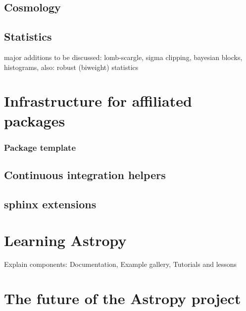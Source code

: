 \documentclass[modern]{aastex61}
\begin{document}

\subsection{Cosmology}


\subsection{Statistics}
major additions to be discussed: lomb-scargle, sigma clipping, bayesian blocks, histograms, also:  robust (biweight) statistics

\section{Infrastructure for affiliated packages}
\subsubsection{Package template}
\subsection{Continuous integration helpers}
\subsection{sphinx extensions}



\section{Learning Astropy}

Explain components: Documentation, Example gallery, Tutorials and lessons

\section{The future of the Astropy project}
\end{document}
